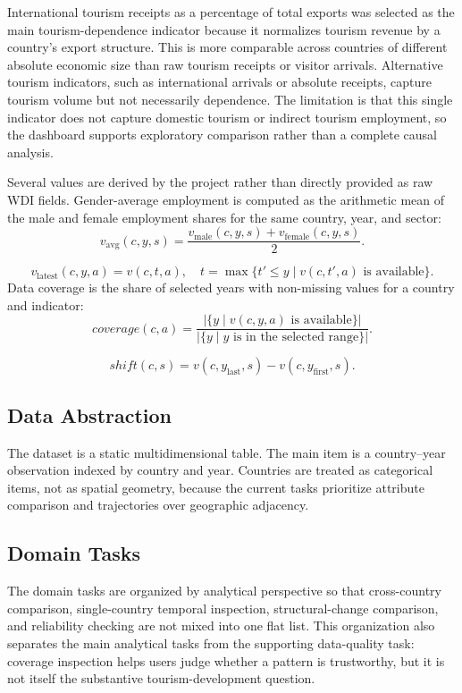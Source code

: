 \documentclass{vgtc}
\begin{document}
International tourism receipts as a percentage of total exports was selected as the main tourism-dependence indicator because it normalizes tourism revenue by a country's export structure. This is more comparable across countries of different absolute economic size than raw tourism receipts or visitor arrivals. Alternative tourism indicators, such as international arrivals or absolute receipts, capture tourism volume but not necessarily dependence. The limitation is that this single indicator does not capture domestic tourism or indirect tourism employment, so the dashboard supports exploratory comparison rather than a complete causal analysis.

Several values are derived by the project rather than directly provided as raw WDI fields. Gender-average employment is computed as the arithmetic mean of the male and female employment shares for the same country, year, and sector:
\[
v_{\mathrm{avg}}(c,y,s) =
\frac{v_{\mathrm{male}}(c,y,s) + v_{\mathrm{female}}(c,y,s)}{2}.
\]

\[
v_{\mathrm{latest}}(c,y,a) = v(c,t,a), \quad
t = \max \{t' \leq y \mid v(c,t',a) \text{ is available}\}.
\]
Data coverage is the share of selected years with non-missing values for a country and indicator:
\[
coverage(c,a) =
\frac{|\{y \mid v(c,y,a) \text{ is available}\}|}
{|\{y \mid y \text{ is in the selected range}\}|}.
\]

\[
shift(c,s) =
v(c,y_{\mathrm{last}},s) - v(c,y_{\mathrm{first}},s).
\]

\subsection{Data Abstraction}

The dataset is a static multidimensional table. The main item is a country--year observation indexed by country and year. Countries are treated as categorical items, not as spatial geometry, because the current tasks prioritize attribute comparison and trajectories over geographic adjacency.

\subsection{Domain Tasks}

The domain tasks are organized by analytical perspective so that cross-country comparison, single-country temporal inspection, structural-change comparison, and reliability checking are not mixed into one flat list. This organization also separates the main analytical tasks from the supporting data-quality task: coverage inspection helps users judge whether a pattern is trustworthy, but it is not itself the substantive tourism-development question.
\end{document}
